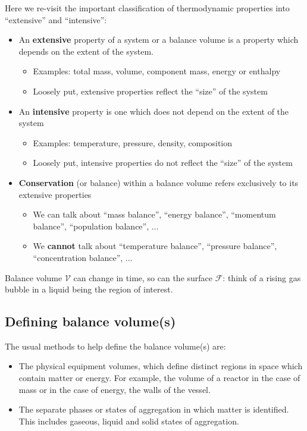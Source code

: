 \documentclass[a4paper,11pt]{article}
\theoremstyle{definition}
\begin{document}
Here we re-visit the important classification of thermodynamic properties into ``extensive'' and ``intensive'':
\begin{itemize}
	\item An \textbf{extensive} property of a system or a balance volume is a property which depends on the extent of the system.
		\begin{itemize}
			\item Examples: total mass, volume, component mass, energy or enthalpy
			\item Loosely put, extensive properties reflect the ``size'' of the system 
		\end{itemize}	
	\item An \textbf{intensive} property is one which does not depend on the extent of the system
		\begin{itemize}
			\item Examples: temperature, pressure, density, composition
			\item Loosely put, intensive properties do not reflect the ``size'' of the system			
		\end{itemize}
	\item \textbf{Conservation} (or balance) within a balance volume refers exclusively to its extensive properties
		\begin{itemize}
			\item We can talk about ``mass balance'', ``energy balance'', ``momentum balance'', ``population balance'', ...
			\item We \textbf{cannot} talk about ``temperature balance'', ``pressure balance'', ``concentration balance'', ...
		\end{itemize}	
\end{itemize}

Balance volume $\mathcal{V}$ can change in time, so can the surface $\mathcal{F}$: 
think of a rising gas bubble in a liquid being the region of interest.


\subsection*{Defining balance volume(s)}

The usual methods to help define the balance volume(s) are:
\begin{itemize}
	\item The physical equipment volumes, which define distinct regions in space which 
	contain matter or energy. For example, the volume of a reactor in the case of
	mass or in the case of energy, the walls of the vessel.
	\item The separate phases or states of aggregation in which matter is identified. This
	includes gaseous, liquid and solid states of aggregation.
\end{itemize}
\end{document}
